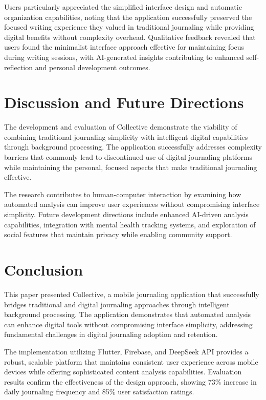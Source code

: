 \documentclass[conference]{IEEEtran}
\begin{document}
Users particularly appreciated the simplified interface design and automatic organization capabilities, noting that the application successfully preserved the focused writing experience they valued in traditional journaling while providing digital benefits without complexity overhead. Qualitative feedback revealed that users found the minimalist interface approach effective for maintaining focus during writing sessions, with AI-generated insights contributing to enhanced self-reflection and personal development outcomes.

\section{Discussion and Future Directions}

The development and evaluation of Collective demonstrate the viability of combining traditional journaling simplicity with intelligent digital capabilities through background processing. The application successfully addresses complexity barriers that commonly lead to discontinued use of digital journaling platforms while maintaining the personal, focused aspects that make traditional journaling effective.

The research contributes to human-computer interaction by examining how automated analysis can improve user experiences without compromising interface simplicity. Future development directions include enhanced AI-driven analysis capabilities, integration with mental health tracking systems, and exploration of social features that maintain privacy while enabling community support.

\section{Conclusion}

This paper presented Collective, a mobile journaling application that successfully bridges traditional and digital journaling approaches through intelligent background processing. The application demonstrates that automated analysis can enhance digital tools without compromising interface simplicity, addressing fundamental challenges in digital journaling adoption and retention.

The implementation utilizing Flutter, Firebase, and DeepSeek API provides a robust, scalable platform that maintains consistent user experience across mobile devices while offering sophisticated content analysis capabilities. Evaluation results confirm the effectiveness of the design approach, showing 73\% increase in daily journaling frequency and 85\% user satisfaction ratings.
\end{document}
